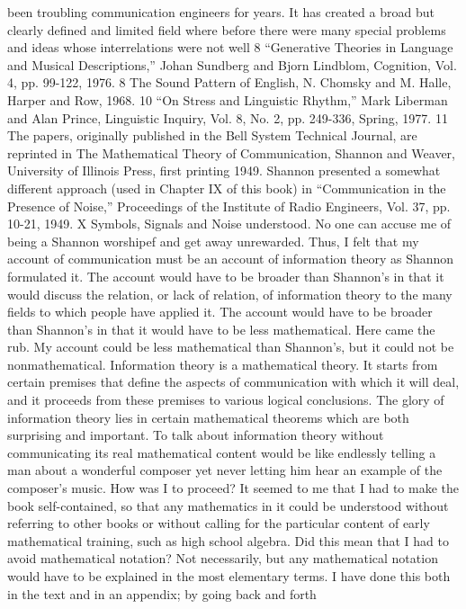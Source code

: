 been troubling communication engineers for years. It has created a
broad but clearly defined and limited field where before there were
many special problems and ideas whose interrelations were not well
8 “Generative Theories in Language and Musical Descriptions,” Johan
Sundberg and Bjorn Lindblom, Cognition, Vol. 4, pp. 99-122, 1976.
8 The Sound Pattern of English, N. Chomsky and M. Halle, Harper and
Row, 1968.
10 “On Stress and Linguistic Rhythm,” Mark Liberman and Alan Prince,
Linguistic Inquiry, Vol. 8, No. 2, pp. 249-336, Spring, 1977.
11 The papers, originally published in the Bell System Technical Journal,
are reprinted in The Mathematical Theory of Communication, Shannon and
Weaver, University of Illinois Press, first printing 1949. Shannon presented
a somewhat different approach (used in Chapter IX of this book) in “Communication
in the Presence of Noise,” Proceedings of the Institute of Radio
Engineers, Vol. 37, pp. 10-21, 1949.
X
Symbols, Signals and Noise
understood. No one can accuse me of being a Shannon worshipef
and get away unrewarded.
Thus, I felt that my account of communication must be an
account of information theory as Shannon formulated it. The
account would have to be broader than Shannon’s in that it would
discuss the relation, or lack of relation, of information theory to
the many fields to which people have applied it. The account would
have to be broader than Shannon’s in that it would have to be less
mathematical.
Here came the rub. My account could be less mathematical than
Shannon’s, but it could not be nonmathematical. Information
theory is a mathematical theory. It starts from certain premises
that define the aspects of communication with which it will deal,
and it proceeds from these premises to various logical conclusions.
The glory of information theory lies in certain mathematical
theorems which are both surprising and important. To talk about
information theory without communicating its real mathematical
content would be like endlessly telling a man about a wonderful
composer yet never letting him hear an example of the composer’s
music.
How was I to proceed? It seemed to me that I had to make the
book self-contained, so that any mathematics in it could be understood
without referring to other books or without calling for the
particular content of early mathematical training, such as high
school algebra. Did this mean that I had to avoid mathematical
notation? Not necessarily, but any mathematical notation would
have to be explained in the most elementary terms. I have done
this both in the text and in an appendix; by going back and forth
